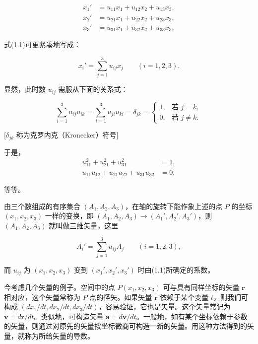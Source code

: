 \documentclass[11pt,a4paper,oneside]{ctexbook}
\newcommand{\ve}[1]{\bm{#1}}
\begin{document}
\begin{equation}
\begin{aligned}
x_1' &= u_{11} x_1 + u_{12} x_2 + u_{13} x_3,\\
x_2' &= u_{21} x_1 + u_{22} x_2 + u_{23} x_3,\\
x_3' &= u_{31} x_1 + u_{32} x_2 + u_{33} x_3,
\end{aligned}
\tag{1.1}
\end{equation}

式(1.1)可更紧凑地写成：

\begin{equation*}
x_i' = \sum_{j=1}^{3} u_{ij} x_j \qquad (i = 1, 2, 3).
\end{equation*}

显然，此时数 $u_{ij}$ 需服从下面的关系式：

\begin{equation}
\sum_{i=1}^{3} u_{ij} u_{ik} = \sum_{i=1}^{3} u_{ji} u_{ki} = \delta_{jk}
= \begin{cases} 1, & \text{若 } j = k,\\ 0, & \text{若 } j \neq k. \end{cases}
\tag{1.1a}
\end{equation}

[$\delta_{jk}$ 称为克罗内克（Kronecker）符号]

于是，
\begin{equation*}
\begin{aligned}
u_{11}^{2} + u_{21}^{2} + u_{31}^{2} &= 1,\\
u_{11} u_{12} + u_{21} u_{22} + u_{31} u_{32} &= 0,
\end{aligned}
\end{equation*}

等等。

由三个数组成的有序集合 $(A_1, A_2, A_3)$，在轴的旋转下能作象上述的点 $P$ 的坐标 $(x_1, x_2, x_3)$ 一样的变换，即
$(A_1, A_2, A_3) \longrightarrow (A_1', A_2', A_3')$，则 $(A_1, A_2, A_3)$ 就叫做三维矢量，这里

\begin{equation}
A_i' = \sum_{j=1}^{3} u_{ij} A_j \qquad (i = 1, 2, 3),
\tag{1.2}
\end{equation}

而 $u_{ij}$ 为 $(x_1, x_2, x_3)$ 变到 $(x_1', x_2', x_3')$ 时由(1.1)所确定的系数。

今考虑几个矢量的例子。空间中的点 $P(x_1, x_2, x_3)$ 可与具有同样坐标的矢量 $\ve{r}$ 相对应，这个矢量常称为 $P$ 点的径矢。如果矢量 $\ve{r}$ 依赖于某个变量 $t$，则我们可构成 $(dx_1/dt, dx_2/dt, dx_3/dt)$，容易验证，它也是矢量。这个矢量常记为 $\ve{v} = d\ve{r}/dt$。类似地，可构造矢量 $\ve{a} = d\ve{v}/dt$。一般地，如有某个坐标依赖于参数的矢量，则通过对原先的矢量按坐标微商可构造一新的矢量。用这种方法得到的矢量，就称为所给矢量的导数。
\end{document}
